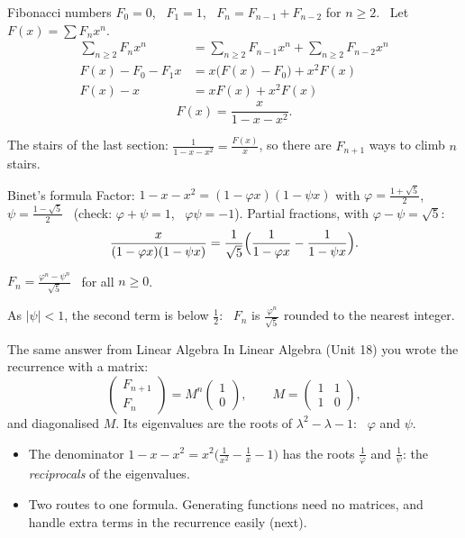 \documentclass[10pt]{wosm-slides}
\begin{document}
\begin{frame}{Fibonacci numbers}
  $F_0 = 0$, \ $F_1 = 1$, \ $F_n = F_{n-1} + F_{n-2}$ for $n \ge 2$. \ Let $F(x) = \sum F_n x^n$.
  \pause
  \begin{align*}
    \sum_{n \ge 2} F_n x^n &= \sum_{n \ge 2} F_{n-1} x^n + \sum_{n \ge 2} F_{n-2} x^n \\
    F(x) - F_0 - F_1 x &= x \bigl(F(x) - F_0\bigr) + x^2 F(x) \\
    F(x) - x &= x F(x) + x^2 F(x)
  \end{align*}
  \pause
  \[ F(x) = \frac{x}{1 - x - x^2} . \]
  {\small The stairs of the last section: $\frac{1}{1 - x - x^2} = \frac{F(x)}{x}$, so there are
  $F_{n+1}$ ways to climb $n$ stairs.\par}
\end{frame}

\begin{frame}{Binet's formula}
  Factor: $1 - x - x^2 = (1 - \varphi x)(1 - \psi x)$ with
  $\varphi = \frac{1 + \sqrt5}{2}$, \ $\psi = \frac{1 - \sqrt5}{2}$ \
  (check: $\varphi + \psi = 1$, \ $\varphi\psi = -1$).
  \pause
  Partial fractions, with $\varphi - \psi = \sqrt5$:
  \[ \frac{x}{(1 - \varphi x)(1 - \psi x)}
     = \frac{1}{\sqrt5}\Bigl( \frac{1}{1 - \varphi x} - \frac{1}{1 - \psi x} \Bigr) . \]
  \pause
  \begin{theorem}
    $\displaystyle F_n = \frac{\varphi^n - \psi^n}{\sqrt5}$ \ for all $n \ge 0$.
  \end{theorem}
  {\small As $|\psi| < 1$, the second term is below $\frac12$: \ $F_n$ is $\frac{\varphi^n}{\sqrt5}$
  rounded to the nearest integer.\par}
\end{frame}

\begin{frame}{The same answer from Linear Algebra}
  In Linear Algebra (Unit 18) you wrote the recurrence with a matrix:
  \[ \begin{pmatrix} F_{n+1} \\ F_n \end{pmatrix}
     = M^n \begin{pmatrix} 1 \\ 0 \end{pmatrix}, \qquad
     M = \begin{pmatrix} 1 & 1 \\ 1 & 0 \end{pmatrix}, \]
  and diagonalised $M$. Its eigenvalues are the roots of $\lambda^2 - \lambda - 1$: \ $\varphi$ and $\psi$.
  \pause
  \begin{itemize}
    \item The denominator $1 - x - x^2 = x^2 \bigl(\frac{1}{x^2} - \frac1x - 1\bigr)$ has the
      roots $\frac{1}{\varphi}$ and $\frac{1}{\psi}$: the \emph{reciprocals} of the eigenvalues.
    \item Two routes to one formula. Generating functions need no matrices, and handle extra
      terms in the recurrence easily (next).
  \end{itemize}
\end{frame}
\end{document}
